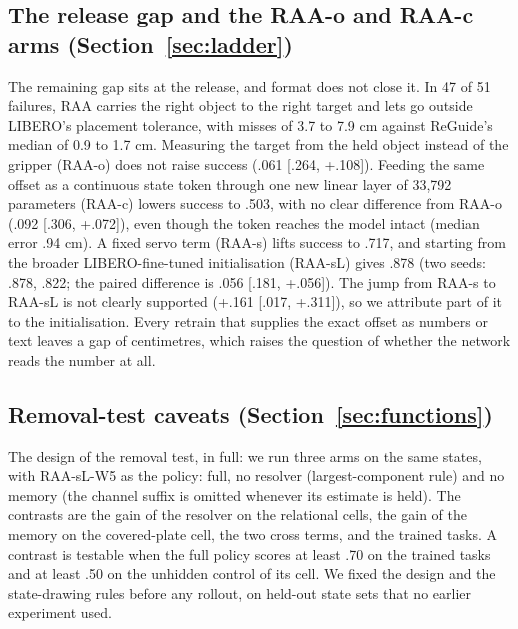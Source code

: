 \subsection{The release gap and the RAA-o and RAA-c arms (Section~\ref{sec:ladder})}
\label{app:L1}

The remaining gap sits at the release, and format does not close it. In 47 of 51 failures, RAA carries the right object to the right target and lets go outside LIBERO's placement tolerance, with misses of 3.7 to 7.9 cm against ReGuide's median of 0.9 to 1.7 cm. Measuring the target from the held object instead of the gripper (RAA-o) does not raise success (\mi.061 [\mi.264, +.108]). Feeding the same offset as a continuous state token through one new linear layer of 33,792 parameters (RAA-c) lowers success to .503, with no clear difference from RAA-o (\mi.092 [\mi.306, +.072]), even though the token reaches the model intact (median error .94 cm). A fixed servo term (RAA-s) lifts success to .717, and starting from the broader LIBERO-fine-tuned initialisation (RAA-sL) gives .878 (two seeds: .878, .822; the paired difference is \mi.056 [\mi.181, +.056]). The jump from RAA-s to RAA-sL is not clearly supported (+.161 [\mi.017, +.311]), so we attribute part of it to the initialisation. Every retrain that supplies the exact offset as numbers or text leaves a gap of centimetres, which raises the question of whether the network reads the number at all.

\subsection{Removal-test caveats (Section~\ref{sec:functions})}
\label{app:L2}

The design of the removal test, in full: we run three arms on the same states, with RAA-sL-W5 as the policy: full, no resolver (largest-component rule) and no memory (the channel suffix is omitted whenever its estimate is held). The contrasts are the gain of the resolver on the relational cells, the gain of the memory on the covered-plate cell, the two cross terms, and the trained tasks. A contrast is testable when the full policy scores at least .70 on the trained tasks and at least .50 on the unhidden control of its cell. We fixed the design and the state-drawing rules before any rollout, on held-out state sets that no earlier experiment used.

